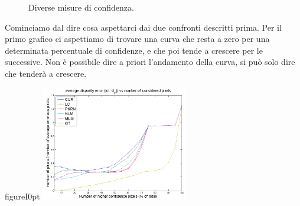 \documentclass[12pt]{report}
\begin{document}
\begin{figure}[H]
				 \quad
				
				\caption{Diverse misure di confidenza.}
				\label{fig:disparità&costi}
			\end{figure}
			
			Cominciamo dal dire cosa aspettarci dai due confronti descritti prima. Per il primo grafico ci aspettiamo di trovare una curva che resta a zero per una determinata percentuale di confidenze, e che  poi tende a crescere per le successive. Non è possibile dire a priori l'andamento della curva, si può solo dire che tenderà a crescere. 
			
			\begin{wrapfloat}{figure}{I}{0pt}
				\includegraphics[width=0.48\textwidth]{./figures/result3.png}
				\caption{Errore di disparità medio nella figura \textit{Aloe}.}
				\label{fig:risultati2}
			\end{wrapfloat}
			
\end{document}
